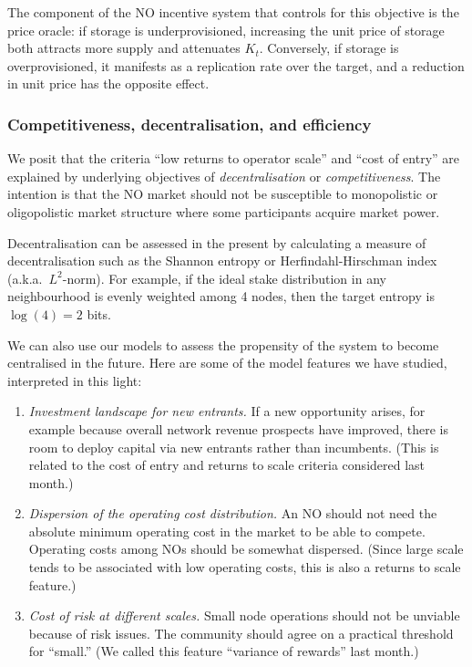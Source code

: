 The component of the NO incentive system that controls for this objective is the price oracle: if storage is underprovisioned, increasing the unit price of storage both attracts more supply and attenuates $K_t$.
%
Conversely, if storage is overprovisioned, it manifests as a replication rate over the target, and a reduction in unit price has the opposite effect.

\subsubsection*{Competitiveness, decentralisation, and efficiency}

We posit that the criteria ``low returns to operator scale'' and ``cost of entry'' are explained by underlying objectives of \emph{decentralisation} or \emph{competitiveness}.
%
The intention is that the NO market should not be susceptible to monopolistic or oligopolistic market structure where some participants acquire market power.

Decentralisation can be assessed in the present by calculating a measure of decentralisation such as the Shannon entropy or Herfindahl-Hirschman index (a.k.a.~$L^2$-norm).
%
For example, if the ideal stake distribution in any neighbourhood is evenly weighted among 4 nodes, then the target entropy is $\log(4)=2$ bits.

We can also use our models to assess the propensity of the system to become centralised in the future.
%
Here are some of the model features we have studied, interpreted in this light:
\begin{enumerate}
  \item \emph{Investment landscape for new entrants.} If a new opportunity arises, for example because overall network revenue prospects have improved, there is room to deploy capital via new entrants rather than incumbents. (This is related to the cost of entry and returns to scale criteria considered last month.)
  \item \emph{Dispersion of the operating cost distribution.} An NO should not need the absolute minimum operating cost in the market to be able to compete. Operating costs among NOs should be somewhat dispersed. (Since large scale tends to be associated with low operating costs, this is also a returns to scale feature.) 
  \item \emph{Cost of risk at different scales.} Small node operations should not be unviable because of risk issues. The community should agree on a practical threshold for ``small.'' (We called this feature ``variance of rewards'' last month.)
\end{enumerate}

